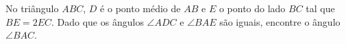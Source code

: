 No triângulo $ABC$, $D$ é o ponto médio de $AB$ e $E$ o ponto do lado $BC$ tal que $BE = 2 EC$. Dado que os ângulos $\angle ADC$ e $\angle BAE$ são iguais, encontre o ângulo $\angle BAC$.